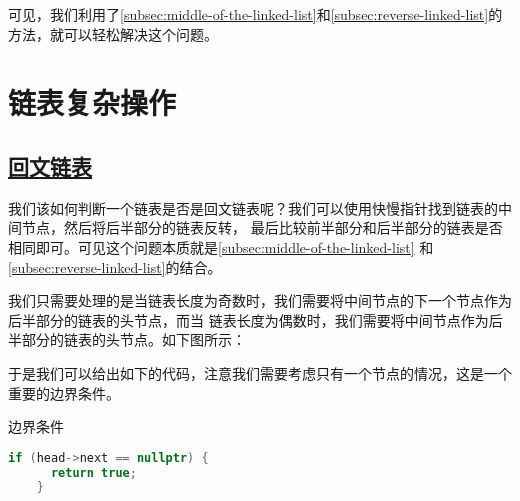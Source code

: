 \documentclass[../../main.tex]{subfiles}
\begin{document}
可见，我们利用了\ref{subsec:middle-of-the-linked-list}和\ref{subsec:reverse-linked-list}的
方法，就可以轻松解决这个问题。

\section{链表复杂操作}

\subsection{\href{https://leetcode.cn/problems/palindrome-linked-list/}{回文链表}}

我们该如何判断一个链表是否是回文链表呢？我们可以使用快慢指针找到链表的中间节点，然后将后半部分的链表反转，
最后比较前半部分和后半部分的链表是否相同即可。可见这个问题本质就是\ref{subsec:middle-of-the-linked-list}
和\ref{subsec:reverse-linked-list}的结合。

我们只需要处理的是当链表长度为奇数时，我们需要将中间节点的下一个节点作为后半部分的链表的头节点，而当
链表长度为偶数时，我们需要将中间节点作为后半部分的链表的头节点。如下图所示：



于是我们可以给出如下的代码，注意我们需要考虑只有一个节点的情况，这是一个重要的边界条件。

\begin{marginlisting}[-0.5cm]
  \caption{边界条件}

  \vspace{0.2cm}
  \begin{lstlisting}[language=C++,style=kaolstplain]
    if (head->next == nullptr) {
      return true;
    }
  \end{lstlisting}
\end{marginlisting}
\end{document}
